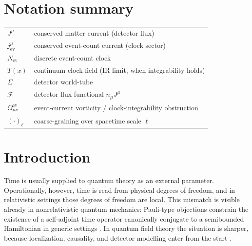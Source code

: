 \documentclass[11pt, a4paper]{article}
\theoremstyle{definition}
\theoremstyle{plain}
\theoremstyle{remark}
\numberwithin{equation}{section}
\begin{document}
    \vfill


    \section*{Notation summary}
        
        \begin{center}
            \begin{tabular}{ll}
                $J^\mu$ & conserved matter current (detector flux) \\
                $j^\mu_{\mathrm{ev}}$ & conserved event-count current (clock sector) \\
                $N_{\mathrm{ev}}$ & discrete event-count clock \\
                $T(x)$ & continuum clock field (IR limit, when integrability holds) \\
                $\Sigma$ & detector world-tube \\
                $\mathcal{F}$ & detector flux functional $n_\mu J^\mu$ \\
                $\Omega^{\mathrm{ev}}_{\mu\nu}$ & event-current vorticity / clock-integrability obstruction \\
                $(\cdot)_\ell$ & coarse-graining over spacetime scale $\ell$
            \end{tabular}
        \end{center}

        \newpage
    \section{Introduction}
        
        Time is usually supplied to quantum theory as an external parameter. Operationally, however, time is read from physical degrees of freedom, and in relativistic settings those degrees of freedom are local. This mismatch is visible already in nonrelativistic quantum mechanics: Pauli-type objections constrain the existence of a self-adjoint time operator canonically conjugate to a semibounded Hamiltonian in generic settings \cite{Pauli1980,Muga2008}. In quantum field theory the situation is sharper, because localization, causality, and detector modelling enter from the start \cite{Muga2008,ColosiOeckl2025TimeOperatorTOA}.
        
\end{document}
